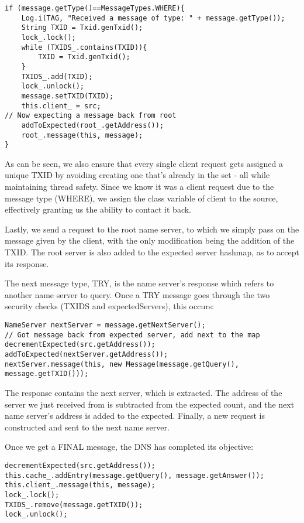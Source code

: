 \documentclass[a4paper, 12pt]{article} %
\begin{document}
\begin{lstlisting}
if (message.getType()==MessageTypes.WHERE){
    Log.i(TAG, "Received a message of type: " + message.getType());
    String TXID = Txid.genTxid();
    lock_.lock();
    while (TXIDS_.contains(TXID)){
    	TXID = Txid.genTxid();
    }
    TXIDS_.add(TXID);
    lock_.unlock();
    message.setTXID(TXID);
    this.client_ = src;            
// Now expecting a message back from root
    addToExpected(root_.getAddress());
    root_.message(this, message);           
}	
\end{lstlisting}

As can be seen, we also ensure that every single client request gets assigned a unique TXID by avoiding creating one that’s already in the set - all while maintaining thread safety. Since we know it was a client request due to the message type (WHERE), we assign the class variable of client to the source, effectively granting us the ability to contact it back. 

Lastly, we send a request to the root name server, to which we simply pass on the message given by the client, with the only modification being the addition of the TXID. The root server is also added to the expected server hashmap, as to accept its response. 

The next message type, TRY, is the name server’s response which refers to another name server to query. Once a TRY message goes through the two security checks (TXIDS and expectedServers), this occurs: 

\begin{lstlisting}
NameServer nextServer = message.getNextServer();
// Got message back from expected server, add next to the map 
decrementExpected(src.getAddress());
addToExpected(nextServer.getAddress());
nextServer.message(this, new Message(message.getQuery(), message.getTXID()));
\end{lstlisting}

The response contains the next server, which is extracted. The address of the server we just received from is subtracted from the expected count, and the next name server’s address is added to the expected. Finally, a new request is constructed and sent to the next name server. 

Once we get a FINAL message, the DNS has completed its objective: 

\begin{lstlisting}
decrementExpected(src.getAddress());
this.cache_.addEntry(message.getQuery(), message.getAnswer());
this.client_.message(this, message);
lock_.lock();
TXIDS_.remove(message.getTXID());
lock_.unlock();	
\end{lstlisting}
\end{document}
